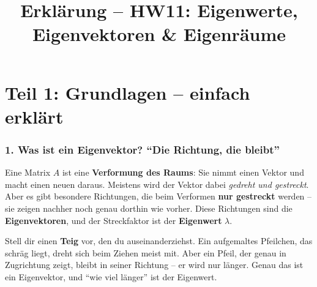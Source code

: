 \documentclass[a4paper,12pt]{article}
\title{Erkl\"arung -- HW11: Eigenwerte, Eigenvektoren \& Eigenr\"aume}
\author{}
\date{}
\begin{document}
\maketitle

\part*{Teil 1: Grundlagen -- einfach erkl\"art}

\section*{1. Was ist ein Eigenvektor? ``Die Richtung, die bleibt''}

Eine Matrix $A$ ist eine \textbf{Verformung des Raums}: Sie nimmt einen Vektor und macht einen neuen daraus. Meistens wird der Vektor dabei \emph{gedreht und gestreckt}. Aber es gibt besondere Richtungen, die beim Verformen \textbf{nur gestreckt} werden -- sie zeigen nachher noch genau dorthin wie vorher. Diese Richtungen sind die \textbf{Eigenvektoren}, und der Streckfaktor ist der \textbf{Eigenwert} $\lambda$.

\begin{center}
\end{center}

\begin{analogie}
Stell dir einen \textbf{Teig} vor, den du auseinanderziehst. Ein aufgemaltes Pfeilchen, das schr\"ag liegt, dreht sich beim Ziehen meist mit. Aber ein Pfeil, der genau in Zugrichtung zeigt, bleibt in seiner Richtung -- er wird nur l\"anger. Genau das ist ein Eigenvektor, und ``wie viel l\"anger'' ist der Eigenwert.
\end{analogie}
\end{document}
